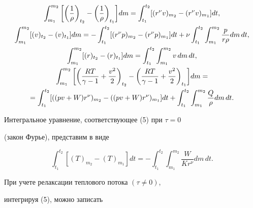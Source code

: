 \begin{gather}


\int_{m_{1}}^{m_{2}}\bigg[\bigg(\frac


{1}{\rho}\bigg)_{t_{2}}-\bigg(\frac {1}{\rho}\bigg)_{t_{1}}\bigg]dm =


\int_{t_{1}}^{t_{2}}[(r^{\nu}{ v })_{m_{2}}-(r^{\nu}{ v })_{m_{1}}]dt,\\


%


\int_{m_{1}}^{m_{2}}[( v )_{t_{2}}-( v )_{t_{1}}]dm =


- \int_{t_{1}}^{t_{2}}[(r^{\nu}p)_{m_{2}}-(r^{\nu}p)_{m_{1}}]dt


+ \nu \int_{t_{1}}^{t_{2}}\int_{m_{1}}^{m_{2}} \frac{p}{r{\rho}}dm\,dt,\\


%


\int_{m_{1}}^{m_{2}}[(r)_{t_{2}}-(r)_{t_{1}}]dm =


\int_{t_{1}}^{t_{2}}\int_{m_{1}}^{m_{2}}{ v }\,dm\,dt,\\


%


\int_{m_{1}}^{m_{2}}\bigg[\bigg(\frac{RT}{\gamma-1}+ \frac


{{ v }^2}{2}\bigg)_{t_{2}}-\bigg(\frac{RT}{\gamma-1}+ \frac


{{ v }^2}{2}\bigg)_{t_{1}}\bigg]dm =\notag\\


%


=\int_{t_{1}}^{t_{2}}[((p{ v }+W)r^{\nu})_{m_{2}}-((p{ v }+W)r^{\nu}


)_{m_{1}}]dt + \int_{t_{1}}^{t_{2}}\int_{m_{1}}^{m_{2}}


\frac{Q}{\rho}dm\,dt.


\end{gather}


Интегральное уравнение, соответствующее (5) при ${\tau}=0 $


(закон Фурье), представим в виде


\begin{equation}


\int_{t_{1}}^{t_{2}}[(T)_{m_{2}}-(T)_{m_{1}}]dt= -


\int_{t_{1}}^{t_{2}}\int_{m_{1}}^{m_{2}}\frac{W}{Kr^{\nu}}dm\,dt.


\end{equation}


При учете релаксации теплового потока $({\tau} \neq 0)$,


интегрируя (5), можно записать


